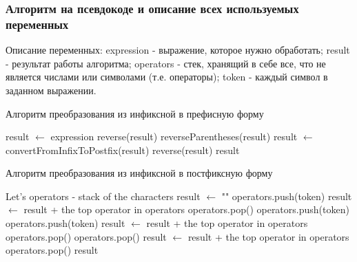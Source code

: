 \documentclass[a4paper, 14pt]{extarticle}
\begin{document}
\subsubsection{Алгоритм на псевдокоде и описание всех используемых переменных}
Описание переменных: expression - выражение, которое нужно обработать;
 result - результат работы алгоритма;
operators - стек, хранящий в себе все, что не является числами или символами
(т.е. операторы); token - каждый символ в заданном выражении.
\begin{algorithm} %
  \caption{Алгоритм преобразования из инфиксной в префисную форму}
  \label{alg:inf_to_pref}
  \begin{algorithmic}
    \State result $\gets$ expression
    \State reverse(result)
    \State reverseParentheses(result) 
    \State result $\gets$ convertFromInfixToPostfix(result)
    \State reverse(result)
    \State \Return result
    \EndFunction
  \end{algorithmic}
\end{algorithm}
\begin{algorithm}
  \caption{Алгоритм преобразования из инфиксной в постфиксную форму}
  \label{alg:inf_to_postf}
  \begin{algorithmic}
    \State Let's operators - stack of the characters
    \State result $\gets$ ""
    \State operators.push(token)
    \State result $\gets$ result + the top operator in operators
    \State operators.pop()
    \EndWhile
    \State operators.push(token)
    \State operators.push(token)
    \State result $\gets$ result + the top operator in operators
    \State operators.pop()
    \State operators.pop()
    \EndIf
    \EndWhile
    \EndIf
    \EndFor
    \State result $\gets$ result + the top operator in operators
    \State operators.pop()
    \EndWhile
    \State \Return result
    \EndFunction
  \end{algorithmic}
\end{algorithm}
\newpage
\end{document}
